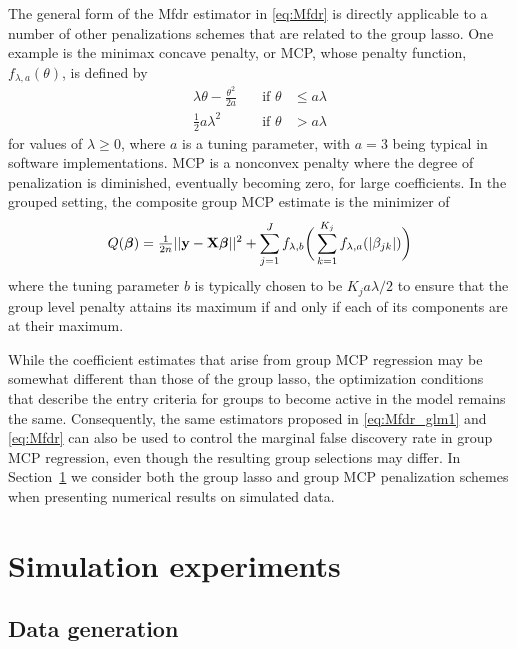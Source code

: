 The general form of the Mfdr estimator in \ref{eq:Mfdr} is directly applicable to a number of other penalizations schemes that are related to the group lasso.  One example is the minimax concave penalty, or MCP, whose penalty function, $f_{\lambda, a}(\theta)$, is defined by
\begin{equation}
  \label{eq:mcp}
  \begin{alignedat}{2}
  \lambda\theta - \tfrac{\theta^2}{2a} &\quad \text{if } \theta &\leq a\lambda \\
  \tfrac{1}{2}a\lambda^2  &\quad \text{if }  \theta &> a\lambda
  \end{alignedat}
\end{equation}
for values of $\lambda \geq 0$, where $a$ is a tuning parameter, with $a = 3$ being typical in software implementations. MCP is a nonconvex penalty where the degree of penalization is diminished, eventually becoming zero, for large coefficients.  In the grouped setting, the composite group MCP estimate \citep{Breheny2012, Huang2012} is the minimizer of
\begin{equation}
Q(\boldsymbol{\beta}) = \tfrac{1}{2n}||\mathbf{y} - \mathbf{X}\boldsymbol{\beta}||^2 + \sum_{j = 1}^{J}f_{\lambda, b}\bigg(\sum_{k=1}^{K_j} f_{\lambda,a}(|\beta_{jk}|)\bigg)
\end{equation}
where the tuning parameter $b$ is typically chosen to be $K_ja\lambda/2$ to ensure that the group level penalty attains its maximum if and only if each of its components are at their maximum.

While the coefficient estimates that arise from group MCP regression may be somewhat different than those of the group lasso, the optimization conditions that describe the entry criteria for groups to become active in the model remains the same.  Consequently, the same estimators proposed in \ref{eq:Mfdr_glm1} and \ref{eq:Mfdr} can also be used to control the marginal false discovery rate in group MCP regression, even though the resulting group selections may differ.  In Section~\ref{Sec:sim} we consider both the group lasso and group MCP penalization schemes when presenting numerical results on simulated data. 


\section{Simulation experiments}
\label{Sec:sim}

\subsection{Data generation}

